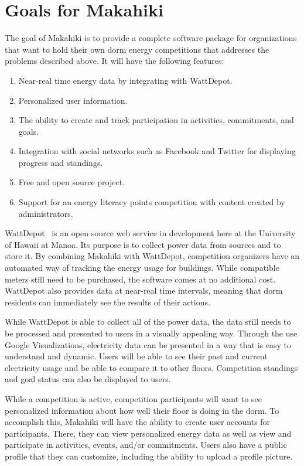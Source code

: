\section{Goals for Makahiki}

The goal of Makahiki is to provide a complete software package for organizations that want to hold their own dorm energy competitions that addresses the problems described above.  It will have the following features:

\begin{enumerate}
	\item Near-real time energy data by integrating with WattDepot.
	\item Personalized user information.
	\item The ability to create and track participation in activities, commitments, and goals.
	\item Integration with social networks such as Facebook and Twitter for displaying progress and standings.
	\item Free and open source project.
	\item Support for an energy literacy points competition with content created by administrators.
\end{enumerate}

WattDepot~\cite{wattdepot} is an open source web service in development here at the University of Hawaii at Manoa.  Its purpose is to collect power data from sources and to store it. By combining Makahiki with WattDepot, competition organizers have an automated way of tracking the energy usage for buildings.  While compatible meters still need to be purchased, the software comes at no additional cost.  WattDepot also provides data at near-real time intervals, meaning that dorm residents can immediately see the results of their actions.

While WattDepot is able to collect all of the power data, the data still needs to be processed and presented to users in a visually appealing way.  Through the use Google Visualizations, electricity data can be presented in a way that is easy to understand and dynamic.  Users will be able to see their past and current electricity usage and be able to compare it to other floors.  Competition standings and goal status can also be displayed to users.

While a competition is active, competition participants will want to see personalized information about how well their floor is doing in the dorm.  To accomplish this, Makahiki will have the ability to create user accounts for participants.  There, they can view personalized energy data as well as view and participate in activities, events, and/or commitments.  Users also have a public profile that they can customize, including the ability to upload a profile picture.

